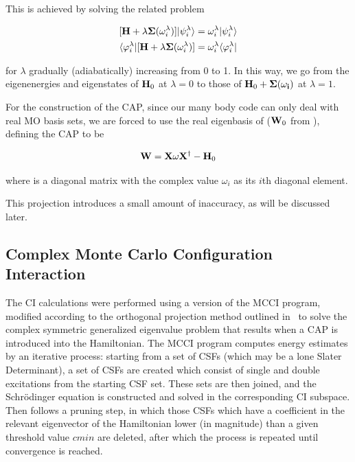 This is achieved by solving the related problem

\begin{subequations}
\begin{align}
	[\mathbf{H} + \lambda \mathbf{\Sigma}(\omega_i^\lambda)] |\psi_i^\lambda \rangle
	&= \omega_i^\lambda |\psi_i^\lambda \rangle \\
	\langle \varphi_i^\lambda| [\mathbf{H} + \lambda \mathbf{\Sigma}(\omega_i^\lambda)]
	&= \omega_i^\lambda \langle \varphi_i^\lambda| 
	\label{eq:adiabaticap}
\end{align}
\end{subequations}

for $\lambda$ gradually (adiabatically) increasing from 0 to 1. In this way, we
go from the eigenenergies and eigenstates of $\mathbf{H}_0$ at $\lambda = 0$ to
those of $\mathbf{H}_0 + \mathbf{\Sigma(\omega_i)}$ at $\lambda = 1$.

For the construction of the \ac{CAP}, since our many body code can only deal
with real MO basis sets, we are forced to use the real eigenbasis of 
($\mathbf{W}_0$ from \cite{henderson}), defining the \ac{CAP} to be

\begin{equation}
	\mathbf{W} = \mathbf{X}\mathbf{\omega}\mathbf{X}^\dagger - \mathbf{H}_0
	\label{eq:capsdef}
\end{equation}

where \umm{\omega} is a diagonal matrix with the complex value $\omega_i$ as
its $i$th diagonal element.

This projection introduces a small amount of inaccuracy, as will be discussed
later.

\subsection{Complex Monte Carlo Configuration Interaction}

The \ac{CI} calculations were performed using a version of the \ac{MCCI}
program, modified according to the orthogonal projection method outlined
in~\cite{tarantelli_csd} to solve the complex symmetric generalized eigenvalue
problem that results when a \ac{CAP} is introduced into the Hamiltonian. The
\ac{MCCI} program computes energy estimates by an iterative process: starting
from a set of \acp{CSF} (which may be a lone Slater Determinant), a set of
\acp{CSF} are created which consist of single and double excitations from the
starting \ac{CSF} set. These sets are then joined, and the Schr\"odinger
equation is constructed and solved in the corresponding \ac{CI} subspace. Then
follows a pruning step, in which those \acp{CSF} which have a coefficient in
the relevant eigenvector of the Hamiltonian lower (in magnitude) than a given
threshold value $cmin$ are deleted, after which the process is repeated until
convergence is reached.

